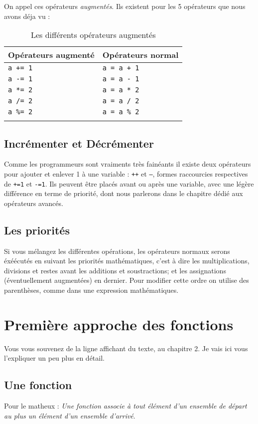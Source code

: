 On appel ces opérateurs \emph{augmentés}. Ils existent pour les 5 opérateurs que nous avons déja vu :

\begin{longtabu} to \linewidth {|X[,l,m]|X[,l,m]|}
\hline Opérateurs augmenté & Opérateurs normal \\ \hline
\endhead
\texttt{a += 1} & \texttt{a = a + 1} \\ \hline
\texttt{a -= 1} & \texttt{a = a - 1} \\ \hline
\texttt{a *= 2} & \texttt{a = a * 2} \\ \hline
\texttt{a /= 2} & \texttt{a = a / 2} \\ \hline
\texttt{a \%= 2} & \texttt{a = a \% 2} \\ \hline
\caption{Les différents opérateurs augmentés}
\end{longtabu}

\subsection{Incrémenter et Décrémenter}
Comme les programmeurs sont vraiments très fainéants il existe deux opérateurs pour ajouter et enlever 1 à une variable : \texttt{++} et \texttt{--}, formes raccourcies respectives de \texttt{+=1} et \texttt{-=1}. Ils peuvent être placés avant ou après une variable, avec une légère différence en terme de priorité, dont nous parlerons dans le chapitre dédié aux opérateurs avancés.
\subsection{Les priorités}
Si vous mélangez les différentes opérations, les opérateurs normaux serons éxéécutés en suivant les priorités mathématiques, c'est à dire les multiplications, divisions et restes avant les additions et soustractions; et les assignations (éventuellement augmentées) en dernier.
Pour modifier cette ordre on utilise des parenthèses, comme dans une expression mathématiques.
\section{Première approche des fonctions}
Vous vous souvenez de la ligne affichant du texte, au chapitre 2. Je vais ici vous l'expliquer un peu plus en détail.
\subsection{Une fonction}
Pour le matheux : \emph{Une fonction associe à tout élément d'un ensemble de départ au plus un élément d'un ensemble d'arrivé}.

